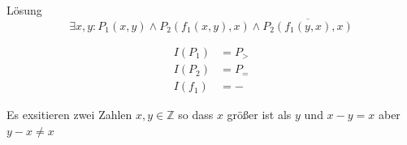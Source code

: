 {\begin{frame}{Lösung}
    $$\exists x,y: P_1(x,y) \wedge P_2(f_1(x,y),x) \wedge \overline{P_2(f_1(y,x),x)}$$

    \begin{align*}
            I(P_1) &= P_{>}\\
            I(P_2) &= P_{=}\\
            I(f_1) &= -
    \end{align*}

    Es exsitieren zwei Zahlen $x,y \in \mathbb Z$ so dass $x$ größer ist als $y$ und $x-y=x$ aber $y-x\neq x$
    
\end{frame}
}



